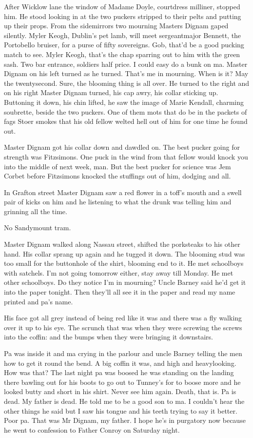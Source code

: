 After Wicklow lane the window of Madame Doyle, courtdress
milliner, stopped him. He stood looking in at the two puckers stripped to
their pelts and putting up their props. From the sidemirrors two mourning
Masters Dignam gaped silently. Myler Keogh, Dublin's pet lamb, will meet
sergeantmajor Bennett, the Portobello bruiser, for a purse of fifty
sovereigns. Gob, that'd be a good pucking match to see. Myler Keogh,
that's the chap sparring out to him with the green sash. Two bar entrance,
soldiers half price. I could easy do a bunk on ma. Master Dignam on his
left turned as he turned. That's me in mourning. When is it? May the
twentysecond. Sure, the blooming thing is all over. He turned to the right
and on his right Master Dignam turned, his cap awry, his collar sticking
up. Buttoning it down, his chin lifted, he saw the image of Marie Kendall,
charming soubrette, beside the two puckers. One of them mots that do be in
the packets of fags Stoer smokes that his old fellow welted hell out of
him for one time he found out.

Master Dignam got his collar down and dawdled on. The best pucker
going for strength was Fitzsimons. One puck in the wind from that fellow
would knock you into the middle of next week, man. But the best pucker
for science was Jem Corbet before Fitzsimons knocked the stuffings out of
him, dodging and all.

In Grafton street Master Dignam saw a red flower in a toff's mouth
and a swell pair of kicks on him and he listening to what the drunk was
telling him and grinning all the time.

No Sandymount tram.

Master Dignam walked along Nassau street, shifted the porksteaks to
his other hand. His collar sprang up again and he tugged it down. The
blooming stud was too small for the buttonhole of the shirt, blooming end
to it. He met schoolboys with satchels. I'm not going tomorrow either,
stay away till Monday. He met other schoolboys. Do they notice I'm in
mourning? Uncle Barney said he'd get it into the paper tonight. Then
they'll all see it in the paper and read my name printed and pa's name.

His face got all grey instead of being red like it was and there was a
fly walking over it up to his eye. The scrunch that was when they were
screwing the screws into the coffin: and the bumps when they were bringing
it downstairs.

Pa was inside it and ma crying in the parlour and uncle Barney telling
the men how to get it round the bend. A big coffin it was, and high and
heavylooking. How was that? The last night pa was boosed he was standing
on the landing there bawling out for his boots to go out to Tunney's for
to boose more and he looked butty and short in his shirt. Never see him
again. Death, that is. Pa is dead. My father is dead. He told me to be a
good son to ma. I couldn't hear the other things he said but I saw his
tongue and his teeth trying to say it better. Poor pa. That was Mr Dignam,
my father. I hope he's in purgatory now because he went to confession to
Father Conroy on Saturday night.


